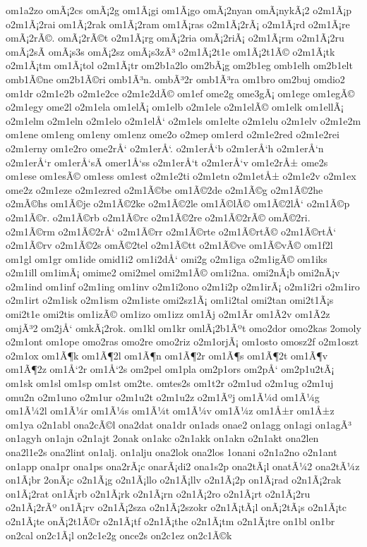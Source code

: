{om1a2zo
omÃ¡2cs
omÃ¡2g
om1Ã¡gi
om1Ã¡go
omÃ¡2nyan
omÃ¡nykÃ¡2
o2m1Ã¡p
o2m1Ã¡2rai
om1Ã¡2rak
om1Ã¡2ram
om1Ã¡ras
o2m1Ã¡2rÃ¡
o2m1Ã¡rd
o2m1Ã¡re
omÃ¡2rÃ©.
omÃ¡2rÃ©t
o2m1Ã¡rg
omÃ¡2ria
omÃ¡2riÃ¡
o2m1Ã¡rm
o2m1Ã¡2ru
omÃ¡2sÃ­
omÃ¡s3s
omÃ¡2sz
omÃ¡s3zÃ³
o2m1Ã¡2t1e
om1Ã¡2t1Ã©
o2m1Ã¡tk
o2m1Ã¡tm
om1Ã¡tol
o2m1Ã¡tr
om2b1a2lo
om2bÃ¡g
om2b1eg
omb1elh
om2b1elt
omb1Ã©ne
om2b1Ã©ri
omb1Ã³n.
ombÃ³2r
omb1Ã³ra
om1bro
om2buj
omdio2
om1dr
o2m1e2b
o2m1e2ce
o2m1e2dÃ©
om1ef
ome2g
ome3gÃ¡
om1ege
om1egÃ©
o2m1egy
ome2l
o2m1ela
om1elÃ¡
om1elb
o2m1ele
o2m1elÃ©
om1elk
om1ellÃ¡
o2m1elm
o2m1eln
o2m1elo
o2m1elÅ‘
o2m1els
om1elte
o2m1elu
o2m1elv
o2m1e2m
om1ene
om1eng
om1eny
om1enz
ome2o
o2mep
om1erd
o2m1e2red
o2m1e2rei
o2m1erny
om1e2ro
ome2rÅ‘
o2m1erÅ‘.
o2m1erÅ‘b
o2m1erÅ‘h
o2m1erÅ‘n
o2m1erÅ‘r
om1erÅ‘sÃ­
omer1Å‘ss
o2m1erÅ‘t
o2m1erÅ‘v
om1e2rÅ±
ome2s
om1ese
om1esÃ©
om1ess
om1est
o2m1e2ti
o2m1etn
o2m1etÅ±
o2m1e2v
o2m1ex
ome2z
o2m1eze
o2m1ezred
o2m1Ã©be
om1Ã©2de
o2m1Ã©g
o2m1Ã©2he
o2mÃ©hs
om1Ã©je
o2m1Ã©2ke
o2m1Ã©2le
om1Ã©lÃ©
om1Ã©2lÅ‘
o2m1Ã©p
o2m1Ã©r.
o2m1Ã©rb
o2m1Ã©rc
o2m1Ã©2re
o2m1Ã©2rÃ©
omÃ©2ri.
o2m1Ã©rm
o2m1Ã©2rÅ‘
o2m1Ã©rr
o2m1Ã©rte
o2m1Ã©rtÃ©
o2m1Ã©rtÅ‘
o2m1Ã©rv
o2m1Ã©2s
omÃ©2tel
o2m1Ã©tt
o2m1Ã©ve
om1Ã©vÃ©
om1f2l
om1gl
om1gr
om1ide
omid1i2
om1i2dÅ‘
omi2g
o2m1iga
o2m1igÃ©
om1iks
o2m1ill
om1imÃ¡
omime2
omi2mel
omi2m1Ã©
om1i2na.
omi2nÃ¡b
omi2nÃ¡v
o2m1ind
om1inf
o2m1ing
om1inv
o2m1i2ono
o2m1i2p
o2m1irÃ¡
o2m1i2ri
o2m1iro
o2m1irt
o2m1isk
o2m1ism
o2m1iste
omi2sz1Ã¡
om1i2tal
omi2tan
omi2t1Ã¡s
omi2t1e
omi2tis
om1izÃ©
om1izo
om1izz
om1Ã­j
o2m1Ã­r
om1Ã­2v
om1Ã­2z
omjÃ³2
om2jÅ‘
omkÃ¡2rok.
om1kl
om1kr
omlÃ¡2b1Ãºt
omo2dor
omo2kas
2omoly
o2m1ont
om1ope
omo2ras
omo2re
omo2riz
o2m1orjÃ¡
om1osto
omosz2f
o2m1oszt
o2m1ox
om1Ã¶k
om1Ã¶2l
om1Ã¶n
om1Ã¶2r
om1Ã¶s
om1Ã¶2t
om1Ã¶v
om1Ã¶2z
om1Å‘2r
om1Å‘2s
om2pel
om1pla
om2p1ors
om2pÅ‘
om2p1u2tÃ¡
om1sk
om1sl
om1sp
om1st
om2te.
omtes2s
om1t2r
o2m1ud
o2m1ug
o2m1uj
omu2n
o2m1uno
o2m1ur
o2m1u2t
o2m1u2z
o2m1Ãºj
om1Ã¼d
om1Ã¼g
om1Ã¼2l
om1Ã¼r
om1Ã¼s
om1Ã¼t
om1Ã¼v
om1Ã¼z
om1Å±r
om1Å±z
om1ya
o2n1abl
ona2cÃ©l
ona2dat
ona1dr
on1ads
onae2
on1agg
on1agi
on1agÃ³
on1agyh
on1ajn
o2n1ajt
2onak
on1akc
o2n1akk
on1akn
o2n1akt
ona2len
ona2l1e2s
ona2lint
on1alj.
on1alju
ona2lok
ona2los
1onani
o2n1a2no
o2n1ant
on1app
ona1pr
ona1ps
ona2rÃ¡c
onarÃ¡di2
ona1s2p
ona2tÃ¡l
onatÃ¼2
ona2tÃ¼z
on1Ã¡br
2onÃ¡c
o2n1Ã¡g
o2n1Ã¡llo
o2n1Ã¡llv
o2n1Ã¡2p
on1Ã¡rad
o2n1Ã¡2rak
on1Ã¡2rat
on1Ã¡rb
o2n1Ã¡rk
o2n1Ã¡rn
o2n1Ã¡2ro
o2n1Ã¡rt
o2n1Ã¡2ru
o2n1Ã¡2rÃº
on1Ã¡rv
o2n1Ã¡2sza
o2n1Ã¡2szokr
o2n1Ã¡tÃ¡l
onÃ¡2tÃ¡s
o2n1Ã¡tc
o2n1Ã¡te
onÃ¡2t1Ã©r
o2n1Ã¡tf
o2n1Ã¡the
o2n1Ã¡tm
o2n1Ã¡tre
on1bl
on1br
on2cal
on2c1Ã¡l
on2c1e2g
once2s
on2c1ez
on2c1Ã©k
}
